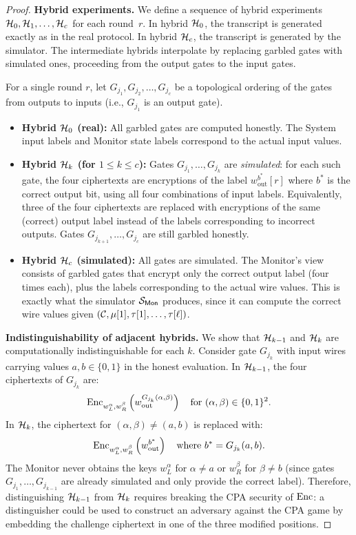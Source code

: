 \begin{proof}
\medskip
\noindent\textbf{Hybrid experiments.} We define a sequence of hybrid experiments $\mathcal{H}_0, \mathcal{H}_1, \ldots, \mathcal{H}_c$ for each round~$r$. In hybrid $\mathcal{H}_0$, the transcript is generated exactly as in the real protocol. In hybrid $\mathcal{H}_c$, the transcript is generated by the simulator. The intermediate hybrids interpolate by replacing garbled gates with simulated ones, proceeding from the output gates to the input gates.

For a single round $r$, let $G_{j_1}, G_{j_2}, \ldots, G_{j_c}$ be a topological ordering of the gates from outputs to inputs (i.e., $G_{j_1}$ is an output gate).

\begin{itemize}
    \item \textbf{Hybrid $\mathcal{H}_0$ (real):} All garbled gates are computed honestly. The System input labels and Monitor state labels correspond to the actual input values.
    
    \item \textbf{Hybrid $\mathcal{H}_k$ (for $1 \leq k \leq c$):} Gates $G_{j_1}, \ldots, G_{j_k}$ are \emph{simulated}: for each such gate, the four ciphertexts are encryptions of the label $w_{\text{out}}^{b^*}[r]$ where $b^*$ is the correct output bit, using all four combinations of input labels. Equivalently, three of the four ciphertexts are replaced with encryptions of the same (correct) output label instead of the labels corresponding to incorrect outputs. Gates $G_{j_{k+1}}, \ldots, G_{j_c}$ are still garbled honestly.
    
    \item \textbf{Hybrid $\mathcal{H}_c$ (simulated):} All gates are simulated. The Monitor's view consists of garbled gates that encrypt only the correct output label (four times each), plus the labels corresponding to the actual wire values. This is exactly what the simulator $\mathcal{S}_{\textsf{Mon}}$ produces, since it can compute the correct wire values given $(\mathcal{C}, \mu[1], \tau[1], \ldots, \tau[\ell])$.
\end{itemize}

\medskip
\noindent\textbf{Indistinguishability of adjacent hybrids.}
We show that $\mathcal{H}_{k-1}$ and $\mathcal{H}_k$ are computationally indistinguishable for each $k$. Consider gate $G_{j_k}$ with input wires carrying values $a, b \in \{0,1\}$ in the honest evaluation. In $\mathcal{H}_{k-1}$, the four ciphertexts of $G_{j_k}$ are:
\[
\text{Enc}_{w_L^\alpha, w_R^\beta}\left(w_{\text{out}}^{G_{j_k}(\alpha,\beta)}\right) \quad \text{for } (\alpha, \beta) \in \{0,1\}^2.
\]
In $\mathcal{H}_k$, the ciphertext for $(\alpha, \beta) \neq (a, b)$ is replaced with:
\[
\text{Enc}_{w_L^\alpha, w_R^\beta}\left(w_{\text{out}}^{b^*}\right) \quad \text{where } b^* = G_{j_k}(a,b).
\]
The Monitor never obtains the keys $w_L^\alpha$ for $\alpha \neq a$ or $w_R^\beta$ for $\beta \neq b$ (since gates $G_{j_1}, \ldots, G_{j_{k-1}}$ are already simulated and only provide the correct label). Therefore, distinguishing $\mathcal{H}_{k-1}$ from $\mathcal{H}_k$ requires breaking the CPA security of $\text{Enc}$: a distinguisher could be used to construct an adversary against the CPA game by embedding the challenge ciphertext in one of the three modified positions.


\end{proof}
